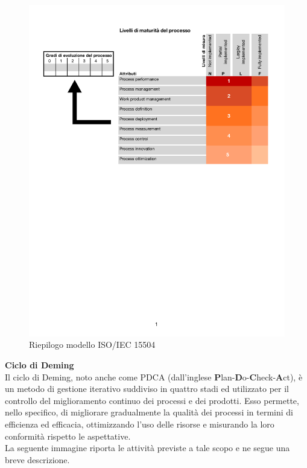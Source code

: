 \documentclass[11pt,a4paper]{article}
\begin{document}
{\begin{figure}[H]
	\includegraphics[scale=0.7]{images/ISOIEC15504.pdf}
	\caption{Riepilogo modello ISO/IEC 15504}
\end{figure}
\noindent
\textbf{Ciclo di Deming} \\
Il ciclo di Deming, noto anche come PDCA (dall'inglese \textbf{P}lan-\textbf{D}o-\textbf{C}heck-\textbf{A}ct), è un metodo di gestione iterativo suddiviso in quattro stadi ed utilizzato per il controllo del miglioramento continuo dei processi e dei prodotti. Esso permette, nello specifico, di migliorare gradualmente la qualità dei processi in termini di efficienza ed efficacia, ottimizzando l'uso delle risorse e misurando la loro conformità rispetto le aspettative. \\
La seguente immagine riporta le attività previste a tale scopo e ne segue una breve descrizione. 

}
\end{document}
